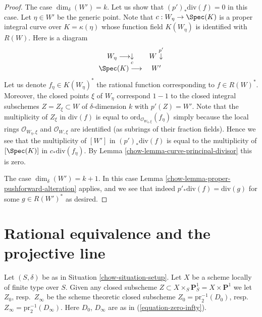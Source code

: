 \begin{proof}
\medskip\noindent
The case $\dim_\delta(W') = k$. Let us show that $(p')_*\text{div}(f) = 0$
in this case. Let $\eta \in W'$ be the generic point.
Note that $c : W_\eta \to \Spec(K)$
is a proper integral curve over $K = \kappa(\eta)$
whose function field $K(W_\eta)$ is identified with $R(W)$.
Here is a diagram
$$
\begin{array}{cc}W_\eta \longrightarrow\underset{c}{\downarrow} & W \overset{p'}{\downarrow} \\ \Spec(K) \longrightarrow & W'\end{array}
$$
Let us denote $f_\eta \in K(W_\eta)^*$ the rational function
corresponding to $f \in R(W)^*$.
Moreover, the closed points $\xi$ of $W_\eta$ correspond $1 - 1$ to the
closed integral subschemes $Z = Z_\xi \subset W$ of $\delta$-dimension $k$
with $p'(Z) = W'$. Note that the multiplicity
of $Z_\xi$ in $\text{div}(f)$ is equal to
$\text{ord}_{\mathcal{O}_{W_\eta, \xi}}(f_\eta)$ simply because the
local rings $\mathcal{O}_{W_\eta, \xi}$ and $\mathcal{O}_{W, \xi}$
are identified (as subrings of their fraction fields).
Hence we see that the multiplicity of $[W']$ in
$(p')_*\text{div}(f)$ is equal to the multiplicity of
$[\Spec(K)]$ in $c_*\text{div}(f_\eta)$.
By Lemma \ref{chow-lemma-curve-principal-divisor} this is zero.

\medskip\noindent
The case $\dim_\delta(W') = k + 1$. In this case
Lemma \ref{chow-lemma-proper-pushforward-alteration} applies,
and we see that indeed $p'_*\text{div}(f) = \text{div}(g)$
for some $g \in R(W')^*$ as desired.
\end{proof}

\section{Rational equivalence and the projective line}
\label{chow-section-different-rational-equivalence}
Let $(S, \delta)$ be as in Situation \ref{chow-situation-setup}.
Let $X$ be a scheme locally of finite type over $S$.
Given any closed subscheme
$Z \subset X \times_S \mathbf{P}^1_S = X \times \mathbf{P}^1$
we let $Z_0$, resp.\ $Z_\infty$ be the scheme theoretic closed
subscheme $Z_0 = \text{pr}_2^{-1}(D_0)$,
resp.\ $Z_\infty = \text{pr}_2^{-1}(D_\infty)$.
Here $D_0$, $D_\infty$ are as in (\ref{equation-zero-infty}).

